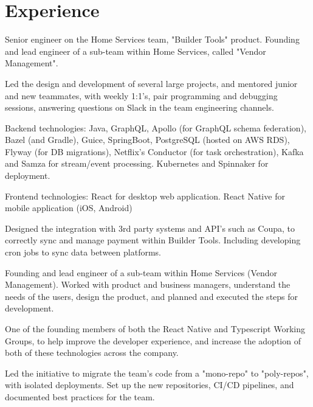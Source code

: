 \documentclass[letterpaper]{deedy-resume-openfont} %
\begin{document}

\lastupdated %


\section{Experience}
\sectionheadersep


\begin{tightemize}
\item Senior engineer on the Home Services team, "Builder Tools" product. Founding and lead engineer of a sub-team within Home Services, called "Vendor Management".
\item Led the design and development of several large projects, and mentored junior and new teammates, with weekly 1:1's, pair programming and debugging sessions, answering questions on Slack in the team engineering channels.
\item Backend technologies: Java, GraphQL, Apollo (for GraphQL schema federation), Bazel (and Gradle), Guice, SpringBoot, PostgreSQL (hosted on AWS RDS), Flyway (for DB migrations), Netflix's Conductor (for task orchestration), Kafka and Samza for stream/event processing. Kubernetes and Spinnaker for deployment. 
\item Frontend technologies: React for desktop web application. React Native for mobile application (iOS, Android)
\item Designed the integration with 3rd party systems and API's such as Coupa, to correctly sync and manage payment within Builder Tools. Including developing cron jobs to sync data between platforms.
\item Founding and lead engineer of a sub-team within Home Services (Vendor Management). Worked with product and business managers, understand the needs of the users, design the product, and planned and executed the steps for development.
\item One of the founding members of both the React Native and Typescript Working Groups, to help improve the developer experience, and increase the adoption of both of these technologies across the company.
\item Led the initiative to migrate the team's code from a "mono-repo" to "poly-repos", with isolated deployments. Set up the new repositories, CI/CD pipelines, and documented best practices for the team.
\end{tightemize}
\end{document}
